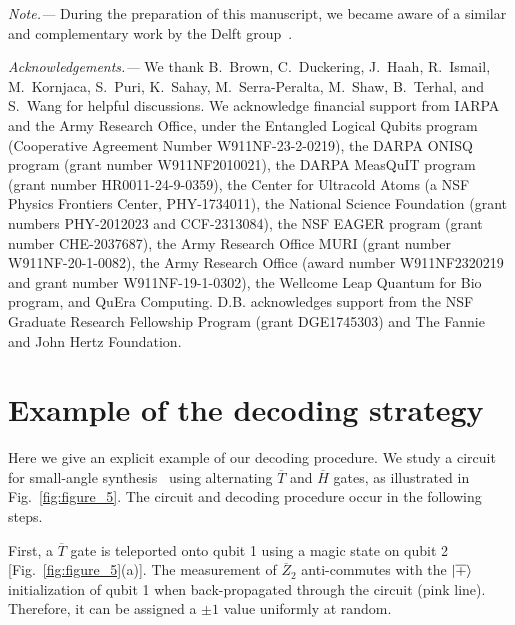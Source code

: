 \documentclass[prx,twocolumn,secnumarabic,balancelastpage,amsmath,amssymb,longbibliography]{revtex4-2}
\newcommand{\lop}[1]{\overline{#1}}
\newcommand{\lket}[1]{\ket{\overline{#1}}}
\begin{document}
\textit{Note.---} During the preparation of this manuscript, we became aware of a similar and complementary work by the Delft group~\cite{serra-peralta2025decoding}. %
\\

\begin{acknowledgments}
\textit{Acknowledgements.---}
We thank B.~Brown, C.~Duckering, J.~Haah, R.~Ismail, M.~Kornjaca, S.~Puri, K.~Sahay, M.~Serra-Peralta, M.~Shaw, B.~Terhal, and S.~Wang for helpful discussions. 
%
We acknowledge financial support from IARPA and the Army Research Office, under the Entangled Logical Qubits program (Cooperative Agreement Number W911NF-23-2-0219), the DARPA ONISQ program (grant number W911NF2010021), the DARPA MeasQuIT program (grant number HR0011-24-9-0359), the Center for Ultracold Atoms (a NSF Physics Frontiers Center, PHY-1734011), the National Science Foundation (grant numbers PHY-2012023 and  CCF-2313084), the NSF EAGER program (grant number CHE-2037687), the Army Research Office MURI (grant number W911NF-20-1-0082), the Army Research Office (award number W911NF2320219 and grant number W911NF-19-1-0302), the Wellcome Leap Quantum for Bio program, and QuEra Computing.
%
D.B. acknowledges support from the NSF Graduate Research Fellowship Program (grant DGE1745303) and The Fannie and John Hertz Foundation.
\end{acknowledgments}

\newpage

\appendix

\newpage
\setcounter{page}{11}
\makeatletter
\renewcommand{\theequation}{S\arabic{equation}}
\renewcommand{\thefigure}{S\arabic{figure}}
\renewcommand{\thetable}{S\arabic{table}}
\renewcommand{\refname}{}

\section{Example of the decoding strategy\label{appendix:decoding_example}}

Here we give an explicit example of our decoding procedure. 
%
We study a circuit for small-angle synthesis~\cite{dawson2005solovay} using alternating $\lop{T}$ and $\lop{H}$ gates, as illustrated in Fig.~\ref{fig:figure_5}. 
%
The circuit and decoding procedure occur in the following steps.

First, a $\lop{T}$ gate is teleported onto qubit 1 using a magic state on qubit 2 [Fig.~\ref{fig:figure_5}(a)].
%
The measurement of $\lop{Z}_2$ anti-commutes with the $\lket{+}$ initialization of qubit 1 when back-propagated through the circuit (pink line).
%
Therefore, it can be assigned a $\pm 1$ value uniformly at random.
\end{document}
